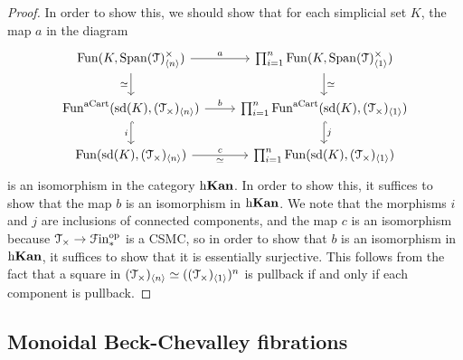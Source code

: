 \documentclass[main.tex]{subfiles}
\begin{document}
\begin{proof}
  In order to show this, we should show that for each simplicial set $K$, the map $a$ in the diagram
  \begin{equation*}
    \begin{tikzcd}
      \Fun(K, \Span(\category{T})^{\times}_{\langle n \rangle})
      \arrow[r, "a"]
      \arrow[d, swap, "\simeq"]
      & \prod_{i = 1}^{n} \Fun(K, \Span(\category{T})^{\times}_{\langle 1 \rangle})
      \arrow[d, "\simeq"]
      \\
      \Fun^{\aCart}(\sd(K), (\category{T}_{\times})_{\langle n \rangle}) \arrow[r, "b"]
      \arrow[d, hook, "i"{swap}]
      & \prod_{i = 1}^{n} \Fun^{\aCart}(\sd(K), (\category{T}_{\times})_{\langle 1 \rangle})
      \arrow[d, hook, "j"]
      \\
      \Fun(\sd(K), (\category{T}_{\times})_{\langle n \rangle}) \arrow[r, "c", "\simeq"{swap}]
      & \prod_{i = 1}^{n} \Fun(\sd(K), (\category{T}_{\times})_{\langle 1 \rangle})
    \end{tikzcd}
  \end{equation*}
  is an isomorphism in the category $\mathrm{h} \mathbf{Kan}$. In order to show this, it suffices to show that the map $b$ is an isomorphism in $\mathrm{h} \mathbf{Kan}$. We note that the morphisms $i$ and $j$ are inclusions of connected components, and the map $c$ is an isomorphism because $\mathcal{T}_{\times} \to \mathcal{F}\mathrm{in}_{*}^{\mathrm{op}}$ is a CSMC, so in order to show that $b$ is an isomorphism in $\mathrm{h}\mathbf{Kan}$, it suffices to show that it is essentially surjective. This follows from the fact that a square in $(\mathcal{T}_{\times})_{\langle n \rangle} \simeq ((\mathcal{T}_{\times})_{\langle 1 \rangle})^{n}$ is pullback if and only if each component is pullback.
\end{proof}


\subsection{Monoidal Beck-Chevalley fibrations}
\label{ssc:monoidal_beck_chevalley_fibrations}
\end{document}
